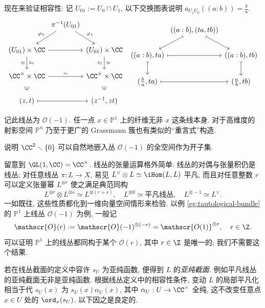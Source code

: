 \begin{example}[重言式线丛]
	现在来验证相容性: 记 $U_{01} := U_0 \cap U_1$, 以下交换图表说明 $a_{U_1 U_0}((a:b)) = \frac{b}{a}$.
	\[\begin{tikzcd}[column sep=0]
	& \pi^{-1}(U_{01}) \arrow[ld, "\varphi_0"'] \arrow[rd, "\varphi_1"] & \\
	(U_{01}) \times \CC \arrow[rr] \arrow[d, "\simeq"', "z_0"] & & (U_{01}) \times \CC \arrow[d, "\simeq", "z_1"'] \\
	\CC^\times \times \CC \arrow[rr, "\sim"] & & \CC^\times \times \CC \\
	(z, t) \arrow[mapsto, rr] \arrow[phantom, u, "\in" sloped] & & (z^{-1}, zt) \arrow[phantom, u, "\in" sloped]
	\end{tikzcd} \; \begin{tikzcd}[column sep=0]
	& \left( (a:b), (ta,tb) \right) \arrow[mapsto, ld] \arrow[mapsto, rd] & \\
	((a:b), ta) \arrow[mapsto, rr] \arrow[mapsto, d] & & ((a:b), tb) \arrow[mapsto, d] \\
	(\frac{b}{a}, ta) \arrow[mapsto, rr] & & (\frac{a}{b}, tb) \\
	\end{tikzcd}\]
	
	记此线丛为 $\mathscr{O}(-1)$. 任一点 $x \in \mathbb{P}^1$ 上的纤维无非 $x$ 这条线本身. 对于高维度的射影空间 $\mathbb{P}^n$ 乃至于更广的 Grassmann 簇也有类似的``重言式''构造.
\end{example}

\begin{exercise}
	说明 $\CC^2 \smallsetminus \{0\}$ 可以自然地嵌入丛 $\mathscr{O}(-1)$ 的全空间作为开子集.
\end{exercise}

留意到 $\GL(1,\CC) = \CC^\times$. 线丛的张量运算格外简单: 线丛的对偶与张量积仍是线丛; 对任意线丛 $\pi: L \to X$, 易见 $L^\vee \otimes L \simeq \iHom(L,L)$ 平凡, 而且对任意整数 $r$ 可以定义张量幂 $L^{\otimes r}$ 使之满足典范同构
\[ L^{\otimes r} \otimes L^{\otimes s} \simeq L^{\otimes (r+s)}, \quad L^{\otimes 0} \simeq \text{平凡线丛}, \quad L^{\otimes -1} \simeq L^\vee. \]
一如既往, 这些性质都化到一维向量空间情形来检验. 以例 \ref{eg:tautological-bundle} 的 $\mathbb{P}^1$ 上线丛 $\mathscr{O}(-1)$ 为例, 一般记
\[ \mathscr{O}(r) := \mathscr{O}(-1)^{\otimes (-r)} = \mathscr{O(1)}^{\otimes r}, \quad r \in \Z. \]
可以证明 $\mathbb{P}^1$ 上的线丛都同构于某个 $\mathscr{O}(r)$, 其中 $r \in \Z$ 是唯一的; 我们不需要这个结果.

若在线丛截面的定义中容许 $s_U$ 为亚纯函数, 便得到 $L$ 的\emph{亚纯截面}. 例如平凡线丛的亚纯截面无非是亚纯函数. 根据线丛定义中的相容性条件, 变动 $L$ 的局部平凡化相当于代 $s_U(x)$ 为 $s_U(x) \alpha_U(x)$, 其中 $\alpha_U: U \to \CC^\times$ 全纯, 这不改变任意点 $x \in U$ 处的 $\ord_x(s_U)$. 以下因之是良定的.

